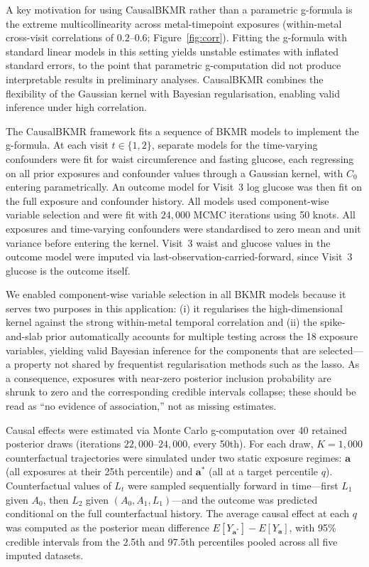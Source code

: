 A key motivation for using CausalBKMR rather than a parametric g-formula is the extreme multicollinearity across metal-timepoint exposures (within-metal cross-visit correlations of $0.2$--$0.6$; Figure~\ref{fig:corr}). Fitting the g-formula with standard linear models in this setting yields unstable estimates with inflated standard errors, to the point that parametric g-computation did not produce interpretable results in preliminary analyses. CausalBKMR combines the flexibility of the Gaussian kernel with Bayesian regularisation, enabling valid inference under high correlation.

The CausalBKMR framework fits a sequence of BKMR models to implement the g-formula. At each visit $t \in \{1, 2\}$, separate models for the time-varying confounders were fit for waist circumference and fasting glucose, each regressing on all prior exposures and confounder values through a Gaussian kernel, with $C_0$ entering parametrically. An outcome model for Visit~3 log glucose was then fit on the full exposure and confounder history. All models used component-wise variable selection \citep{bobb_bkmr_2015} and were fit with $24{,}000$ MCMC iterations using 50 knots. All exposures and time-varying confounders were standardised to zero mean and unit variance before entering the kernel. Visit~3 waist and glucose values in the outcome model were imputed via last-observation-carried-forward, since Visit~3 glucose is the outcome itself.

We enabled component-wise variable selection in all BKMR models because it serves two purposes in this application: (i) it regularises the high-dimensional kernel against the strong within-metal temporal correlation and (ii) the spike-and-slab prior automatically accounts for multiple testing across the 18 exposure variables, yielding valid Bayesian inference for the components that are selected---a property not shared by frequentist regularisation methods such as the lasso. As a consequence, exposures with near-zero posterior inclusion probability are shrunk to zero and the corresponding credible intervals collapse; these should be read as ``no evidence of association,'' not as missing estimates.

Causal effects were estimated via Monte Carlo g-computation over 40 retained posterior draws (iterations $22{,}000$--$24{,}000$, every 50th). For each draw, $K = 1{,}000$ counterfactual trajectories were simulated under two static exposure regimes: $\mathbf{a}$ (all exposures at their 25th percentile) and $\mathbf{a}^*$ (all at a target percentile $q$). Counterfactual values of $L_t$ were sampled sequentially forward in time---first $L_1$ given $A_0$, then $L_2$ given $(A_0, A_1, L_1)$---and the outcome was predicted conditional on the full counterfactual history. The average causal effect at each $q$ was computed as the posterior mean difference $E[Y_{\mathbf{a}^*}] - E[Y_{\mathbf{a}}]$, with 95\% credible intervals from the 2.5th and 97.5th percentiles pooled across all five imputed datasets.

